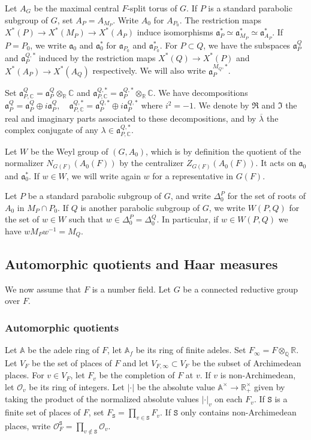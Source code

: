\documentclass[letterpaper,11pt]{amsart}
\newcommand{\fa}{\mathfrak{a}}
\newcommand{\bA}{\mathbb{A}}
\newcommand{\C}{\mathbb{C}}
\newcommand{\Q}{\mathbb{Q}}
\newcommand{\R}{\mathbb{R}}
\newcommand{\cO}{\mathcal{O}}
\newcommand{\tS}{\mathtt{S}}
\newcommand{\<}{\negthickspace}
\newcommand{\valP}[1]{\left|#1\right|}
\theoremstyle{definition}
\theoremstyle{plain}
\theoremstyle{remark}
\numberwithin{equation}{section}
\begin{document}
Let $A_G$ be the maximal central $F$-split torus of $G$. If $P$ is a standard parabolic subgroup of $G$, set $A_P=A_{M_P}$. Write $A_0$ for $A_{P_0}$. The restriction maps $X^*(P) \to X^*(M_P) \to X^*(A_P)$ induce isomorphisms $\fa_P^* \simeq \fa^*_{M_P} \simeq \fa_{A_P}^*$. If $P=P_0$, we write $\fa_0$ and $\fa_0^*$ for $\fa_{P_0}$ and $\fa_{P_0}^*$. For $P \subset Q$, we have the subspaces $\fa_P^Q$ and $\fa_P^{Q,*}$ induced by the restriction maps $X^*(Q)\to X^*(P)$ and $X^*(A_P) \to X^*(A_Q)$ respectively. We will also write $\fa_P^{M_Q,*}$.

Set $\fa_{P,\C}^Q=\fa_{P}^Q \otimes_\R \C$ and $\fa_{P,\C}^{Q,*}=\fa_{P}^{Q,*} \otimes_\R \C$. We have decompositions $\fa_{P}^{Q}=\fa_{P}^{Q} \oplus i \fa_{P}^{Q}, \quad \fa_{P,\C}^{Q,*}=\fa_{P}^{Q,*} \oplus i \fa_{P}^{Q,*}$ where $i^2=-1$. We denote by $\Re$ and $\Im$ the real and imaginary parts associated to these decompositions, and by $\overline{\lambda}$ the complex conjugate of any $\lambda \in \fa_{P,\C}^{Q,*}$.

Let $W$ be the Weyl group of $(G,A_0)$, which is by definition the quotient of the normalizer $N_{G(F)}(A_0(F))$ by the centralizer $Z_{G(F)}(A_0(F))$. It acts on $\fa_0$ and $\fa_0^*$. If $w \in W$, we will write again $w$ for a representative in $G(F)$.

Let $P$ be a standard parabolic subgroup of $G$, and write $\Delta_0^P$ for the set of roots of $A_0$ in $M_P \cap P_0$. If $Q$ is another parabolic subgroup of $G$, we write $W(P,Q)$ for the set of $w \in W$ such that $w \in \Delta_0^P=\Delta_0^Q$. In particular, if $w \in W(P,Q)$ we have $w M_P w^{-1}=M_Q$. 

\subsection{Automorphic quotients and Haar measures}

We now assume that $F$ is a number field. Let $G$ be a connected reductive group over $F$.

\subsubsection{Automorphic quotients} Let $\bA$ be the adele ring of $F$, let $\bA_f$ be its ring of finite adeles. Set $F_\infty=F \otimes_\Q \R$. Let $V_F$ be the set of places of $F$ and let $V_{F,\infty} \subset V_F$ be the subset of Archimedean places. For $v \in V_F$, let $F_v$ be the completion of $F$ at $v$. If $v$ is non-Archimedean, let $\cO_{v}$ be its ring of integers. Let $\valP{\cdot}$ be the absolute value $\bA^\times \to \R_+^\times$ given by taking the product of the normalized absolute values $\valP{\cdot}_v$ on each $F_v$. If $\tS$ is a finite set of places of $F$, set $F_\tS=\prod_{v \in \tS} F_v$. If $\tS$ only contains non-Archimedean places, write $\cO_F^{\tS}=\prod_{v \notin \tS} \cO_{v}$.
\end{document}
